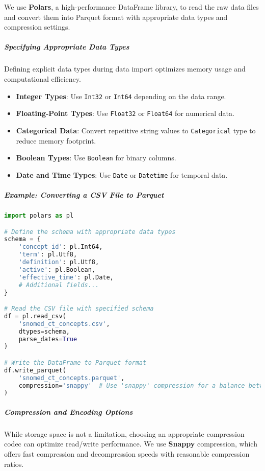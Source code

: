 \documentclass[12pt, a4paper]{article}
\begin{document}
We use \textbf{Polars}, a high-performance DataFrame library, to read the raw data files and convert them into Parquet format with appropriate data types and compression settings.

\subparagraph{Specifying Appropriate Data Types}

Defining explicit data types during data import optimizes memory usage and computational efficiency.

\begin{itemize}
    \item \textbf{Integer Types}: Use \texttt{Int32} or \texttt{Int64} depending on the data range.
    \item \textbf{Floating-Point Types}: Use \texttt{Float32} or \texttt{Float64} for numerical data.
    \item \textbf{Categorical Data}: Convert repetitive string values to \texttt{Categorical} type to reduce memory footprint.
    \item \textbf{Boolean Types}: Use \texttt{Boolean} for binary columns.
    \item \textbf{Date and Time Types}: Use \texttt{Date} or \texttt{Datetime} for temporal data.
\end{itemize}

\subparagraph{Example: Converting a CSV File to Parquet}

\begin{lstlisting}[language=Python, caption=Converting CSV to Parquet using Polars, label=lst:csv_to_parquet]
import polars as pl

# Define the schema with appropriate data types
schema = {
    'concept_id': pl.Int64,
    'term': pl.Utf8,
    'definition': pl.Utf8,
    'active': pl.Boolean,
    'effective_time': pl.Date,
    # Additional fields...
}

# Read the CSV file with specified schema
df = pl.read_csv(
    'snomed_ct_concepts.csv',
    dtypes=schema,
    parse_dates=True
)

# Write the DataFrame to Parquet format
df.write_parquet(
    'snomed_ct_concepts.parquet',
    compression='snappy'  # Use 'snappy' compression for a balance between speed and file size
)
\end{lstlisting}

\subparagraph{Compression and Encoding Options}

While storage space is not a limitation, choosing an appropriate compression codec can optimize read/write performance. We use \textbf{Snappy} compression, which offers fast compression and decompression speeds with reasonable compression ratios.
\end{document}
